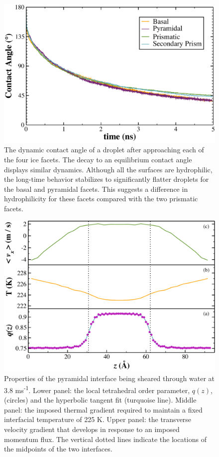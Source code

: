 \documentclass[aps,jcp,preprint,showpacs,superscriptaddress,groupedaddress]{revtex4}  %
\begin{document}
\newpage
\begin{figure}
\includegraphics[width=\linewidth]{ContactAngle}
\caption{\label{fig:ContactAngle} The dynamic contact angle of a
  droplet after approaching each of the four ice facets.  The decay to
  an equilibrium contact angle displays similar dynamics.  Although
  all the surfaces are hydrophilic, the long-time behavior stabilizes
  to significantly flatter droplets for the basal and pyramidal
  facets.  This suggests a difference in hydrophilicity for these
  facets compared with the two prismatic facets.}
\end{figure}

\newpage

\begin{figure}
\includegraphics[width=\linewidth]{Pyr_comic_strip}
\caption{\label{fig:pyrComic} Properties of the pyramidal interface
  being sheared through water at 3.8 ms\textsuperscript{-1}. Lower
  panel: the local tetrahedral order parameter, $q(z)$, (circles) and
  the hyperbolic tangent fit (turquoise line).  Middle panel: the
  imposed thermal gradient required to maintain a fixed interfacial
  temperature of 225 K. Upper panel: the transverse velocity gradient
  that develops in response to an imposed momentum flux. The vertical
  dotted lines indicate the locations of the midpoints of the two
  interfaces.}
\end{figure}
\newpage
\end{document}
